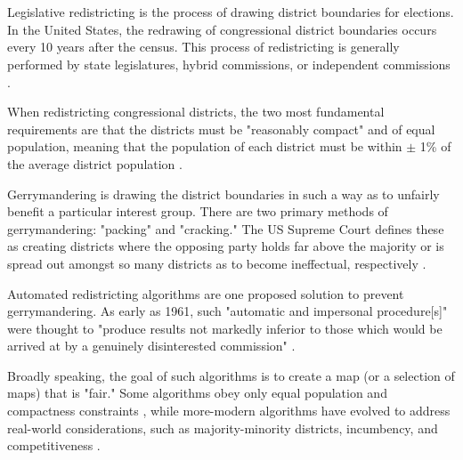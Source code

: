 \makeatletter
\section{\@title}
\makeatother

Legislative redistricting is the process of drawing district boundaries for elections. In the United States, the redrawing of congressional district boundaries occurs every 10 years after the census. This process of redistricting is generally performed by state legislatures, hybrid commissions, or independent commissions \parencite{princetongerrymanderingproject}. 

When redistricting congressional districts, the two most fundamental requirements are that the districts must be "reasonably compact" and of equal population, meaning that the population of each district must be within $\pm$ 1\% of the average district population \parencite{1964}. 

Gerrymandering is drawing the district boundaries in such a way as to unfairly benefit a particular interest group. There are two primary methods of gerrymandering: "packing" and "cracking." The US Supreme Court defines these as creating districts where the opposing party holds far above the majority or is spread out amongst so many districts as to become ineffectual, respectively \parencite{1986}.

Automated redistricting algorithms are one proposed solution to prevent gerrymandering. As early as 1961, such "automatic and impersonal procedure[s]" were thought to "produce results not markedly inferior to those which would be arrived at by a genuinely disinterested commission" \parencite[110]{vickrey1961}.

Broadly speaking, the goal of such algorithms is to create a map (or a selection of maps) that is "fair." Some algorithms obey only equal population and compactness constraints \parencite[e.g.][]{hu1995, altman2009, chen2013}, while more-modern algorithms have evolved to address real-world considerations, such as majority-minority districts, incumbency, and competitiveness \parencite[e.g][]{lara-caballero2019, fifield2020, mccartan2020}. 

